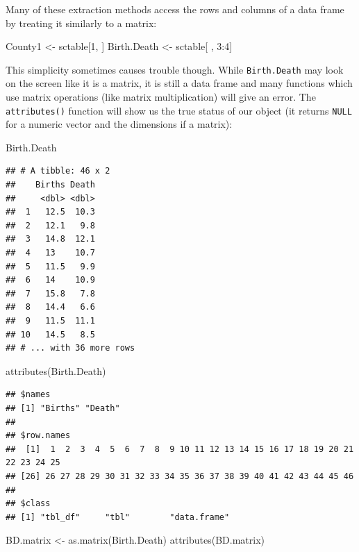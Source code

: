 \documentclass[
]{book}
\newenvironment{Shaded}{\begin{snugshade}}{\end{snugshade}}
\newcommand{\DecValTok}[1]{\textcolor[rgb]{0.00,0.00,0.81}{#1}}
\newcommand{\FunctionTok}[1]{\textcolor[rgb]{0.00,0.00,0.00}{#1}}
\newcommand{\NormalTok}[1]{#1}
\newcommand{\OtherTok}[1]{\textcolor[rgb]{0.56,0.35,0.01}{#1}}
\newcommand{\SpecialCharTok}[1]{\textcolor[rgb]{0.00,0.00,0.00}{#1}}
\begin{document}
Many of these extraction methods access the rows and columns of a data frame by treating it similarly to a matrix:

\begin{Shaded}
\begin{Highlighting}[]
\NormalTok{County1 }\OtherTok{\textless{}{-}}\NormalTok{ sctable[}\DecValTok{1}\NormalTok{, ]}
\NormalTok{Birth.Death }\OtherTok{\textless{}{-}}\NormalTok{ sctable[ , }\DecValTok{3}\SpecialCharTok{:}\DecValTok{4}\NormalTok{]}
\end{Highlighting}
\end{Shaded}

This simplicity sometimes causes trouble though. While \texttt{Birth.Death} may look on the screen like it is a matrix, it is still a data frame and many functions which use matrix operations (like matrix multiplication) will give an error. The \texttt{attributes()} function will show us the true status of our object (it returns \texttt{NULL} for a numeric vector and the dimensions if a matrix):

\begin{Shaded}
\begin{Highlighting}[]
\NormalTok{Birth.Death}
\end{Highlighting}
\end{Shaded}

\begin{verbatim}
## # A tibble: 46 x 2
##    Births Death
##     <dbl> <dbl>
##  1   12.5  10.3
##  2   12.1   9.8
##  3   14.8  12.1
##  4   13    10.7
##  5   11.5   9.9
##  6   14    10.9
##  7   15.8   7.8
##  8   14.4   6.6
##  9   11.5  11.1
## 10   14.5   8.5
## # ... with 36 more rows
\end{verbatim}

\begin{Shaded}
\begin{Highlighting}[]
\FunctionTok{attributes}\NormalTok{(Birth.Death)}
\end{Highlighting}
\end{Shaded}

\begin{verbatim}
## $names
## [1] "Births" "Death" 
## 
## $row.names
##  [1]  1  2  3  4  5  6  7  8  9 10 11 12 13 14 15 16 17 18 19 20 21 22 23 24 25
## [26] 26 27 28 29 30 31 32 33 34 35 36 37 38 39 40 41 42 43 44 45 46
## 
## $class
## [1] "tbl_df"     "tbl"        "data.frame"
\end{verbatim}

\begin{Shaded}
\begin{Highlighting}[]
\NormalTok{BD.matrix }\OtherTok{\textless{}{-}} \FunctionTok{as.matrix}\NormalTok{(Birth.Death)}
\FunctionTok{attributes}\NormalTok{(BD.matrix)}
\end{Highlighting}
\end{Shaded}
\end{document}
